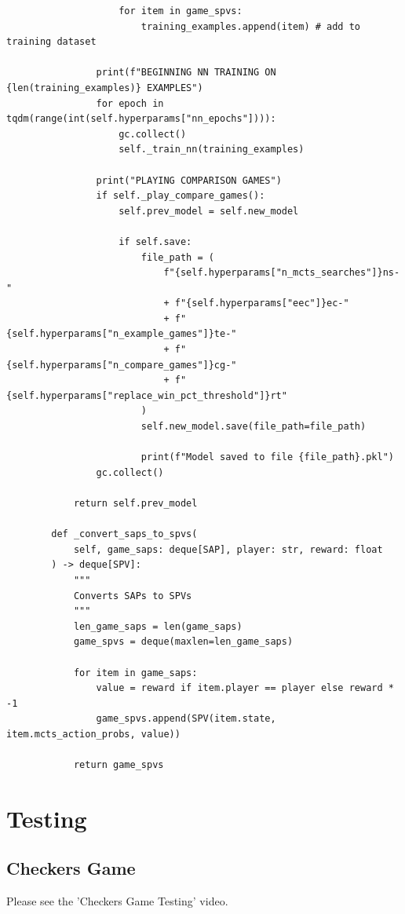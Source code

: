 \documentclass{article}
\begin{document}
\begin{verbatim}
                    for item in game_spvs:
                        training_examples.append(item) # add to training dataset

                print(f"BEGINNING NN TRAINING ON {len(training_examples)} EXAMPLES")
                for epoch in tqdm(range(int(self.hyperparams["nn_epochs"]))):
                    gc.collect()
                    self._train_nn(training_examples)

                print("PLAYING COMPARISON GAMES")
                if self._play_compare_games():
                    self.prev_model = self.new_model

                    if self.save:
                        file_path = (
                            f"{self.hyperparams["n_mcts_searches"]}ns-"
                            + f"{self.hyperparams["eec"]}ec-"
                            + f"{self.hyperparams["n_example_games"]}te-"
                            + f"{self.hyperparams["n_compare_games"]}cg-"
                            + f"{self.hyperparams["replace_win_pct_threshold"]}rt"
                        )
                        self.new_model.save(file_path=file_path)

                        print(f"Model saved to file {file_path}.pkl")
                gc.collect()

            return self.prev_model

        def _convert_saps_to_spvs(
            self, game_saps: deque[SAP], player: str, reward: float
        ) -> deque[SPV]:
            """
            Converts SAPs to SPVs
            """
            len_game_saps = len(game_saps)
            game_spvs = deque(maxlen=len_game_saps)

            for item in game_saps:
                value = reward if item.player == player else reward * -1
                game_spvs.append(SPV(item.state, item.mcts_action_probs, value))

            return game_spvs
    \end{verbatim}

    \section{Testing}
    \secttoc

    \subsection{Checkers Game}

    Please see the 'Checkers Game Testing' video.
\end{document}
